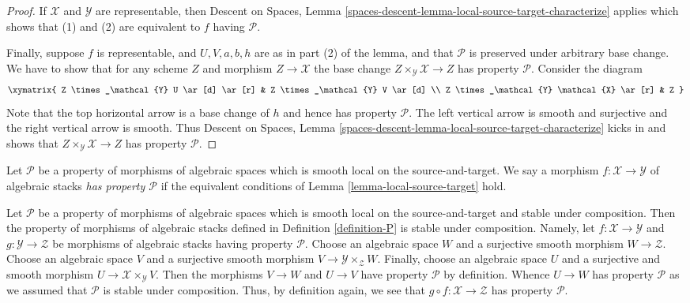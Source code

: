 \begin{proof}
\medskip\noindent
If $\mathcal{X}$ and $\mathcal{Y}$ are representable, then
Descent on Spaces,
Lemma \ref{spaces-descent-lemma-local-source-target-characterize}
applies which shows that (1) and (2) are equivalent to $f$ having
$\mathcal{P}$.

\medskip\noindent
Finally, suppose $f$ is representable, and $U, V, a, b, h$ are
as in part (2) of the lemma, and that $\mathcal{P}$ is preserved under
arbitrary base change. We have to show that for any scheme
$Z$ and morphism $Z \to \mathcal{X}$ the base change
$Z \times_\mathcal{Y} \mathcal{X} \to Z$
has property $\mathcal{P}$. Consider the diagram
$$
\xymatrix{
Z \times_\mathcal{Y} U \ar[d] \ar[r] &
Z \times_\mathcal{Y} V \ar[d] \\
Z \times_\mathcal{Y} \mathcal{X} \ar[r] &
Z
}
$$
Note that the top horizontal arrow is a base change of $h$ and
hence has property $\mathcal{P}$. The left vertical arrow is smooth
and surjective and the right vertical arrow is smooth. Thus
Descent on Spaces,
Lemma \ref{spaces-descent-lemma-local-source-target-characterize}
kicks in and shows that $Z \times_\mathcal{Y} \mathcal{X} \to Z$
has property $\mathcal{P}$.
\end{proof}

\begin{definition}
\label{definition-P}
Let $\mathcal{P}$ be a property of morphisms of algebraic spaces
which is smooth local on the source-and-target.
We say a morphism $f : \mathcal{X} \to \mathcal{Y}$ of algebraic stacks
{\it has property $\mathcal{P}$} if the equivalent conditions of
Lemma \ref{lemma-local-source-target}
hold.
\end{definition}

\begin{remark}
\label{remark-composition}
Let $\mathcal{P}$ be a property of morphisms of algebraic spaces
which is smooth local on the source-and-target and stable under composition.
Then the property of morphisms of algebraic stacks defined in
Definition \ref{definition-P}
is stable under composition. Namely, let $f : \mathcal{X} \to \mathcal{Y}$
and $g : \mathcal{Y} \to \mathcal{Z}$ be morphisms of algebraic stacks
having property $\mathcal{P}$. Choose an algebraic space $W$ and a
surjective smooth morphism $W \to \mathcal{Z}$. Choose an algebraic space
$V$ and a surjective smooth morphism $V \to \mathcal{Y} \times_\mathcal{Z} W$.
Finally, choose an algebraic space $U$ and a surjective and smooth morphism
$U \to \mathcal{X} \times_\mathcal{Y} V$. Then the morphisms
$V \to W$ and $U \to V$ have property $\mathcal{P}$ by definition.
Whence $U \to W$ has property $\mathcal{P}$ as we assumed that
$\mathcal{P}$ is stable under composition. Thus, by definition again,
we see that $g \circ f : \mathcal{X} \to \mathcal{Z}$ has
property $\mathcal{P}$.
\end{remark}

